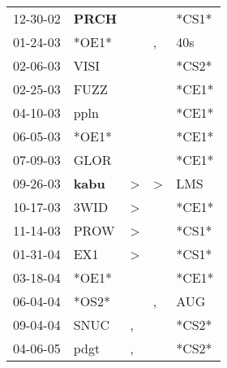 \begin{supertabular}{p{0.07\textwidth}p{0.06\textwidth}p{0.02\textwidth}p{0.02\textwidth}p{0.06\textwidth}}
 12-30-02\textsuperscript{} &  \textbf{PRCH\textsuperscript{}} &               &               &                           *CS1* \\
 01-24-03\textsuperscript{} &                            *OE1* &               &             , &           40s\textsuperscript{} \\
 02-06-03\textsuperscript{} &           VISI\textsuperscript{} &               &               &                           *CS2* \\
 02-25-03\textsuperscript{} &           FUZZ\textsuperscript{} &               &               &                           *CE1* \\
 04-10-03\textsuperscript{} &           ppln\textsuperscript{} &               &               &                           *CE1* \\
 06-05-03\textsuperscript{} &                            *OE1* &               &               &                           *CE1* \\
 07-09-03\textsuperscript{} &           GLOR\textsuperscript{} &               &               &                           *CE1* \\
 09-26-03\textsuperscript{} &  \textbf{kabu\textsuperscript{}} &  \textgreater &  \textgreater &           LMS\textsuperscript{} \\
 10-17-03\textsuperscript{} &           3WID\textsuperscript{} &  \textgreater &               &                           *CE1* \\
 11-14-03\textsuperscript{} &           PROW\textsuperscript{} &  \textgreater &               &                           *CS1* \\
 01-31-04\textsuperscript{} &            EX1\textsuperscript{} &  \textgreater &               &                           *CS1* \\
 03-18-04\textsuperscript{} &                            *OE1* &               &               &                           *CE1* \\
 06-04-04\textsuperscript{} &                            *OS2* &               &             , &           AUG\textsuperscript{} \\
 09-04-04\textsuperscript{} &           SNUC\textsuperscript{} &             , &               &                           *CS2* \\
 04-06-05\textsuperscript{} &           pdgt\textsuperscript{} &             , &               &                           *CS2* \\

\end{supertabular}

